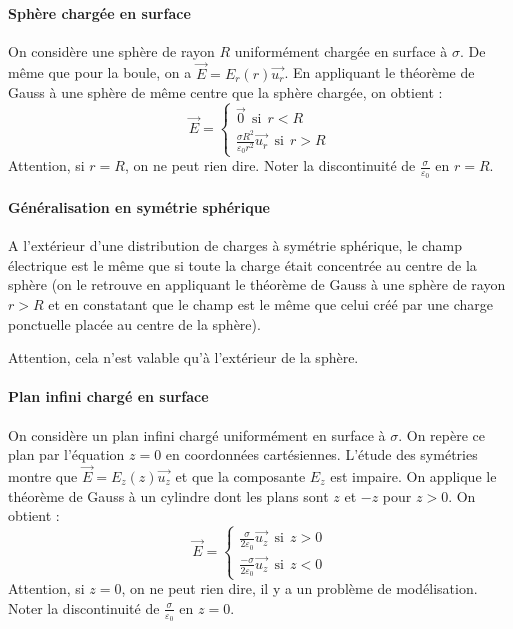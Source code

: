 \documentclass[french]{book}
\theoremstyle{plain}
\theoremstyle{definition}
\theoremstyle{remark}
\begin{document}
\paragraph{Sphère chargée en surface}On considère une sphère de rayon $R$ uniformément chargée en surface à $\sigma$. De même que pour la boule, on a $\overrightarrow{E}=E_r(r)\overrightarrow{u_r}$. En appliquant le théorème de Gauss à une sphère de même centre que la sphère chargée, on obtient : $$\overrightarrow{E}=\begin{cases}
	\overrightarrow{0} \ \ \text{si} \ \ r<R \\[1mm]
	\displaystyle\frac{\sigma R^2}{\varepsilon_0 r^2}\overrightarrow{u_r} \ \ \text{si} \ \ r>R
\end{cases}$$ Attention, si $r=R$, on ne peut rien dire. Noter la discontinuité de $\displaystyle\frac{\sigma}{\varepsilon_0}$ en $r=R$.
\paragraph{Généralisation en symétrie sphérique}
A l'extérieur d'une distribution de charges à symétrie sphérique, le champ électrique est le même que si toute la charge était concentrée au centre de la sphère (on le retrouve en appliquant le théorème de Gauss à une sphère de rayon $r>R$ et en constatant que le champ est le même que celui créé par une charge ponctuelle placée au centre de la sphère). \\ \par Attention, cela n'est valable qu'à l'extérieur de la sphère.
\paragraph{Plan infini chargé en surface}On considère un plan infini chargé uniformément en surface à $\sigma$. On repère ce plan par l'équation $z=0$ en coordonnées cartésiennes. L'étude des symétries montre que $\overrightarrow{E}=E_z(z)\overrightarrow{u_z}$ et que la composante $E_z$ est impaire. On applique le théorème de Gauss à un cylindre dont les plans sont $z$ et $-z$ pour $z>0$. On obtient : $$\overrightarrow{E}=\begin{cases}
	\displaystyle\frac{\sigma}{2\varepsilon_0}\overrightarrow{u_z} \ \ \text{si} \ \ z>0 \\[4mm]
	\displaystyle\frac{-\sigma}{2\varepsilon_0}\overrightarrow{u_z} \ \ \text{si} \ \ z<0
\end{cases}$$ Attention, si $z=0$, on ne peut rien dire, il y a un problème de modélisation. Noter la discontinuité de $\displaystyle\frac{\sigma}{\varepsilon_0}$ en $z=0$.
\end{document}
